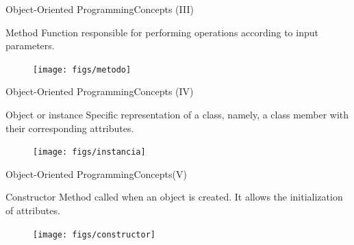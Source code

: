 \documentclass[10pt,compress]{beamer} %
\begin{document}
\begin{frame}{Object-Oriented Programming}{Concepts (III)}
	\vfill\begin{block}{Method}
		 Function responsible for performing operations according to input parameters. 
  	\end{block}	
		\begin{figure}
			\texttt{[image: figs/metodo]}
		\end{figure}				
\end{frame}

\begin{frame}{Object-Oriented Programming}{Concepts (IV)}
	\vfill\begin{block}{Object or instance}
		 Specific representation of a class, namely, a class member with their corresponding attributes.
  	\end{block}	  	
		\begin{figure}
			\texttt{[image: figs/instancia]}
		\end{figure}				
\end{frame}

\begin{frame}{Object-Oriented Programming}{Concepts(V)}
	\begin{block}{Constructor}
		 Method called when an object is created. It allows the initialization of attributes. 
  	\end{block}	
		\begin{figure}
			\texttt{[image: figs/constructor]}
		\end{figure}				
\end{frame}
\end{document}
